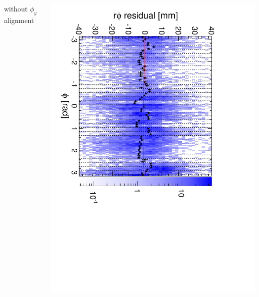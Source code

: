 \documentclass[compress]{beamer}
\begin{document}
\begin{frame}
\begin{columns}
\centering without $\phi_y$ alignment

\includegraphics[height=\linewidth, angle=90]{diskiter02_phiyzero_p2to1outer.pdf}
\end{columns}
\end{frame}
\end{document}
